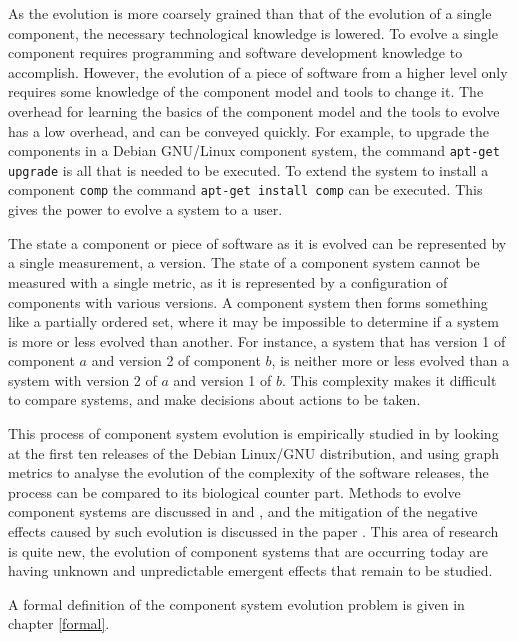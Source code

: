 As the evolution is more coarsely grained than that of the evolution of a single component, the necessary technological knowledge is lowered.
To evolve a single component requires programming and software development knowledge to accomplish.
However, the evolution of a piece of software from a higher level only requires some knowledge of the component model and tools to change it.
The overhead for learning the basics of the component model and the tools to evolve has a low overhead, and can be conveyed quickly.
For example, to upgrade the components in a Debian GNU/Linux component system, the command \verb+apt-get upgrade+ is all that is needed to be executed.
To extend the system to install a component \verb+comp+ the command \verb+apt-get install comp+ can be executed.
This gives the power to evolve a system to a user.

The state a component or piece of software as it is evolved can be represented by a single measurement, a version.
The state of a component system cannot be measured with a single metric, as it is represented by a configuration of components with various versions.
A component system then forms something like a partially ordered set, where it may be impossible to determine if a system is more or less evolved than another.
For instance, a system that has version 1 of component $a$ and version 2 of component $b$, is neither more or less evolved than a system with version 2 of $a$ and version 1 of $b$.
This complexity makes it difficult to compare systems, and make decisions about actions to be taken.

This process of component system evolution is empirically studied in \citep{fortuna2011} by looking at the first ten releases of the Debian Linux/GNU distribution,
and using graph metrics to analyse the evolution of the complexity of the software releases, the process can be compared to its biological counter part.
Methods to evolve component systems are discussed in \citep{Ryan2005} and \citep{Luo2004},
and the mitigation of the negative effects caused by such evolution is discussed in the paper \citep{Stuckenholz2007}.
This area of research is quite new, the evolution of component systems that are occurring today are having unknown and unpredictable emergent effects that remain to be studied.

A formal definition of the component system evolution problem is given in chapter \ref{formal}.

